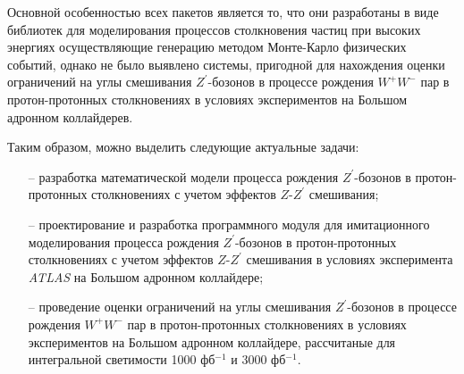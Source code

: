 Основной особенностью всех пакетов является то, что они разработаны в виде библиотек для моделирования процессов столкновения частиц при высоких энергиях осуществляющие генерацию методом Монте-Карло физических событий, однако не было выявлено системы, пригодной для нахождения оценки ограничений на углы смешивания ${Z}^{\prime}$-бозонов в процессе рождения ${W}^{+}$${W}^{-}$ пар в протон-протонных столкновениях в условиях экспериментов на Большом адронном коллайдерев.

Таким образом, можно выделить следующие актуальные задачи:
\begin{enumerate}
	\item[--] разработка математической модели процесса рождения ${Z}^{\prime}$-бозонов в протон-протонных столкновениях с учетом эффектов $Z$-${Z}^{\prime}$ смешивания;
	
	\item[--] проектирование и разработка программного модуля для имитационного моделирования процесса
	рождения ${Z}^{\prime}$-бозонов в протон-протонных столкновениях с учетом эффектов $Z$-${Z}^{\prime}$ смешивания в условиях эксперимента \textit{ATLAS} на Большом адронном коллайдере;
	
	\item[--] проведение оценки ограничений на углы смешивания ${Z}^{\prime}$-бозонов в процессе рождения ${W}^{+}$${W}^{-}$ пар в протон-протонных столкновениях
	в условиях экспериментов на Большом адронном коллайдере, рассчитаные для интегральной светимости 1000 фб${}^{−1}$ и 3000 фб${}^{−1}$.
	
\end{enumerate}